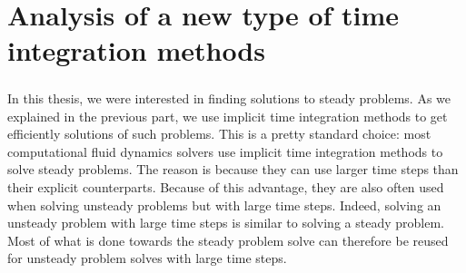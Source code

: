 \chapter{Analysis of a new type of time integration methods}

  \paragraph{}
  In this thesis, we were interested in finding solutions to steady problems.
  As we explained in the previous part, we use implicit time integration methods to get efficiently solutions of such problems.
  This is a pretty standard choice: most computational fluid dynamics solvers use implicit time integration methods to solve steady problems.
  The reason is because they can use larger time steps than their explicit counterparts.
  Because of this advantage, they are also often used when solving unsteady problems but with large time steps.
  Indeed, solving an unsteady problem with large time steps is similar to solving a steady problem.
  Most of what is done towards the steady problem solve can therefore be reused for unsteady problem solves with large time steps.

